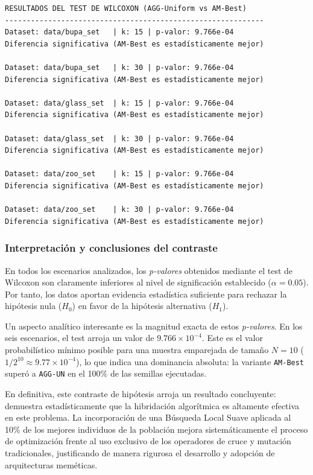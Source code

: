 \documentclass[a4paper,12pt]{article}%
\begin{document}
\begin{verbatim}
RESULTADOS DEL TEST DE WILCOXON (AGG-Uniform vs AM-Best)
------------------------------------------------------------
Dataset: data/bupa_set   | k: 15 | p-valor: 9.766e-04
Diferencia significativa (AM-Best es estadísticamente mejor)

Dataset: data/bupa_set   | k: 30 | p-valor: 9.766e-04
Diferencia significativa (AM-Best es estadísticamente mejor)

Dataset: data/glass_set  | k: 15 | p-valor: 9.766e-04
Diferencia significativa (AM-Best es estadísticamente mejor)

Dataset: data/glass_set  | k: 30 | p-valor: 9.766e-04
Diferencia significativa (AM-Best es estadísticamente mejor)

Dataset: data/zoo_set    | k: 15 | p-valor: 9.766e-04
Diferencia significativa (AM-Best es estadísticamente mejor)

Dataset: data/zoo_set    | k: 30 | p-valor: 9.766e-04
Diferencia significativa (AM-Best es estadísticamente mejor)
\end{verbatim}

\subsubsection*{Interpretación y conclusiones del contraste}

\noindent En todos los escenarios analizados, los \textit{p-valores} obtenidos mediante el test de Wilcoxon son claramente inferiores al nivel de significación establecido ($\alpha = 0.05$). Por tanto, los datos aportan evidencia estadística suficiente para rechazar la hipótesis nula ($H_0$) en favor de la hipótesis alternativa ($H_1$).

Un aspecto analítico interesante es la magnitud exacta de estos \textit{p-valores}. En los seis escenarios, el test arroja un valor de $9.766 \times 10^{-4}$. Este es el valor probabilístico mínimo posible para una muestra emparejada de tamaño $N=10$ ($1/2^{10} \approx 9.77 \times 10^{-4}$), lo que indica una dominancia absoluta: la variante \texttt{AM-Best} superó a \texttt{AGG-UN} en el 100\% de las semillas ejecutadas.

En definitiva, este contraste de hipótesis arroja un resultado concluyente: demuestra estadísticamente que la hibridación algorítmica es altamente efectiva en este problema. La incorporación de una Búsqueda Local Suave aplicada al 10\% de los mejores individuos de la población mejora sistemáticamente el proceso de optimización frente al uso exclusivo de los operadores de cruce y mutación tradicionales, justificando de manera rigurosa el desarrollo y adopción de arquitecturas meméticas.
\end{document}
